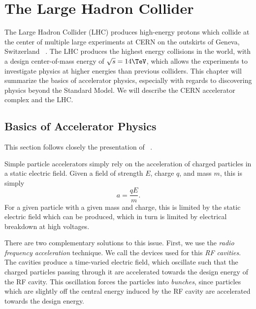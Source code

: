 

\chapter[The Large Hadron Collider][Top of Page Title]{The Large Hadron Collider}

The Large Hadron Collider (LHC) produces high-energy protons which collide at the center of multiple large experiments at CERN on the outskirts of Geneva, Switzerland ~\cite{Evans:2008zzb}.
The LHC produces the highest energy collisions in the world, with a design center-of-mass energy of $\sqrt{s} = 14 \TeV$, which allows the experiments to investigate physics at higher energies than previous colliders.
This chapter will summarize the basics of accelerator physics, especially with regards to discovering physics beyond the Standard Model.
We will describe the CERN accelerator complex and the LHC.

\section{Basics of Accelerator Physics}

This section follows closely the presentation of ~\cite{ShiltsevColliderLectures}.

Simple particle accelerators simply rely on the acceleration of charged particles in a static electric field.
Given a field of strength $E$, charge $q$, and mass $m$, this is simply
\begin{equation}
a = \frac{qE}{m}.
\end{equation}
For a given particle with a given mass and charge, this is limited by the static electric field which can be produced, which in turn is limited by electrical breakdown at high voltages.

There are two complementary solutions to this issue.
First, we use the \textit{radio frequency acceleration} technique.
We call the devices used for this \textit{RF cavities}.
The cavities produce a time-varied electric field, which oscillate such that the charged particles passing through it are accelerated towards the design energy of the RF cavity.
This oscillation forces the particles into \textit{bunches}, since particles which are slightly off the central energy induced by the RF cavity are accelerated towards the design energy.

